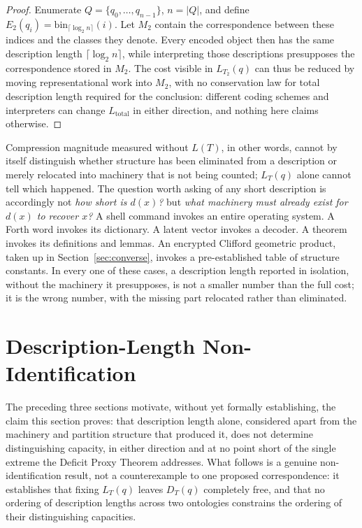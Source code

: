 \documentclass[11pt]{article}
\theoremstyle{plain}
\begin{document}
\begin{proof}
Enumerate $Q = \{q_0, \dots, q_{n-1}\}$, $n = |Q|$, and define $E_2(q_i) = \mathrm{bin}_{\lceil \log_2 n \rceil}(i)$. Let $M_2$ contain the correspondence between these indices and the classes they denote. Every encoded object then has the same description length $\lceil \log_2 n \rceil$, while interpreting those descriptions presupposes the correspondence stored in $M_2$. The cost visible in $L_{T_2}(q)$ can thus be reduced by moving representational work into $M_2$, with no conservation law for total description length required for the conclusion: different coding schemes and interpreters can change $L_{\mathrm{total}}$ in either direction, and nothing here claims otherwise.
\end{proof}

Compression magnitude measured without $L(T)$, in other words, cannot by itself distinguish whether structure has been eliminated from a description or merely relocated into machinery that is not being counted; $L_T(q)$ alone cannot tell which happened. The question worth asking of any short description is accordingly not \emph{how short is $d(x)$?} but \emph{what machinery must already exist for $d(x)$ to recover $x$?} A shell command invokes an entire operating system. A Forth word invokes its dictionary. A latent vector invokes a decoder. A theorem invokes its definitions and lemmas. An encrypted Clifford geometric product, taken up in Section~\ref{sec:converse}, invokes a pre-established table of structure constants. In every one of these cases, a description length reported in isolation, without the machinery it presupposes, is not a smaller number than the full cost; it is the wrong number, with the missing part relocated rather than eliminated.

\section{Description-Length Non-Identification}
\label{sec:nonident}

The preceding three sections motivate, without yet formally establishing, the claim this section proves: that description length alone, considered apart from the machinery and partition structure that produced it, does not determine distinguishing capacity, in either direction and at no point short of the single extreme the Deficit Proxy Theorem addresses. What follows is a genuine non-identification result, not a counterexample to one proposed correspondence: it establishes that fixing $L_T(q)$ leaves $D_T(q)$ completely free, and that no ordering of description lengths across two ontologies constrains the ordering of their distinguishing capacities.
\end{document}
